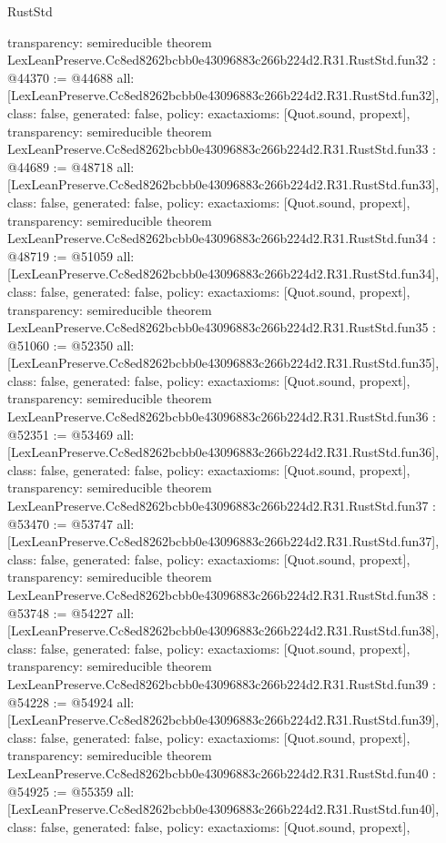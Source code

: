 \begin{lexlean}{RustStd}
\begin{coremodule}
{  transparency: semireducible
}
theorem LexLeanPreserve.Cc8ed8262bcbb0e43096883c266b224d2.R31.RustStd.fun32 : @44370 := @44688 {
  all: [LexLeanPreserve.Cc8ed8262bcbb0e43096883c266b224d2.R31.RustStd.fun32],
  class: false,
  generated: false,
  policy: exact{axioms: [Quot.sound, propext]},
  transparency: semireducible
}
theorem LexLeanPreserve.Cc8ed8262bcbb0e43096883c266b224d2.R31.RustStd.fun33 : @44689 := @48718 {
  all: [LexLeanPreserve.Cc8ed8262bcbb0e43096883c266b224d2.R31.RustStd.fun33],
  class: false,
  generated: false,
  policy: exact{axioms: [Quot.sound, propext]},
  transparency: semireducible
}
theorem LexLeanPreserve.Cc8ed8262bcbb0e43096883c266b224d2.R31.RustStd.fun34 : @48719 := @51059 {
  all: [LexLeanPreserve.Cc8ed8262bcbb0e43096883c266b224d2.R31.RustStd.fun34],
  class: false,
  generated: false,
  policy: exact{axioms: [Quot.sound, propext]},
  transparency: semireducible
}
theorem LexLeanPreserve.Cc8ed8262bcbb0e43096883c266b224d2.R31.RustStd.fun35 : @51060 := @52350 {
  all: [LexLeanPreserve.Cc8ed8262bcbb0e43096883c266b224d2.R31.RustStd.fun35],
  class: false,
  generated: false,
  policy: exact{axioms: [Quot.sound, propext]},
  transparency: semireducible
}
theorem LexLeanPreserve.Cc8ed8262bcbb0e43096883c266b224d2.R31.RustStd.fun36 : @52351 := @53469 {
  all: [LexLeanPreserve.Cc8ed8262bcbb0e43096883c266b224d2.R31.RustStd.fun36],
  class: false,
  generated: false,
  policy: exact{axioms: [Quot.sound, propext]},
  transparency: semireducible
}
theorem LexLeanPreserve.Cc8ed8262bcbb0e43096883c266b224d2.R31.RustStd.fun37 : @53470 := @53747 {
  all: [LexLeanPreserve.Cc8ed8262bcbb0e43096883c266b224d2.R31.RustStd.fun37],
  class: false,
  generated: false,
  policy: exact{axioms: [Quot.sound, propext]},
  transparency: semireducible
}
theorem LexLeanPreserve.Cc8ed8262bcbb0e43096883c266b224d2.R31.RustStd.fun38 : @53748 := @54227 {
  all: [LexLeanPreserve.Cc8ed8262bcbb0e43096883c266b224d2.R31.RustStd.fun38],
  class: false,
  generated: false,
  policy: exact{axioms: [Quot.sound, propext]},
  transparency: semireducible
}
theorem LexLeanPreserve.Cc8ed8262bcbb0e43096883c266b224d2.R31.RustStd.fun39 : @54228 := @54924 {
  all: [LexLeanPreserve.Cc8ed8262bcbb0e43096883c266b224d2.R31.RustStd.fun39],
  class: false,
  generated: false,
  policy: exact{axioms: [Quot.sound, propext]},
  transparency: semireducible
}
theorem LexLeanPreserve.Cc8ed8262bcbb0e43096883c266b224d2.R31.RustStd.fun40 : @54925 := @55359 {
  all: [LexLeanPreserve.Cc8ed8262bcbb0e43096883c266b224d2.R31.RustStd.fun40],
  class: false,
  generated: false,
  policy: exact{axioms: [Quot.sound, propext]},
}
\end{coremodule}
\end{lexlean}
